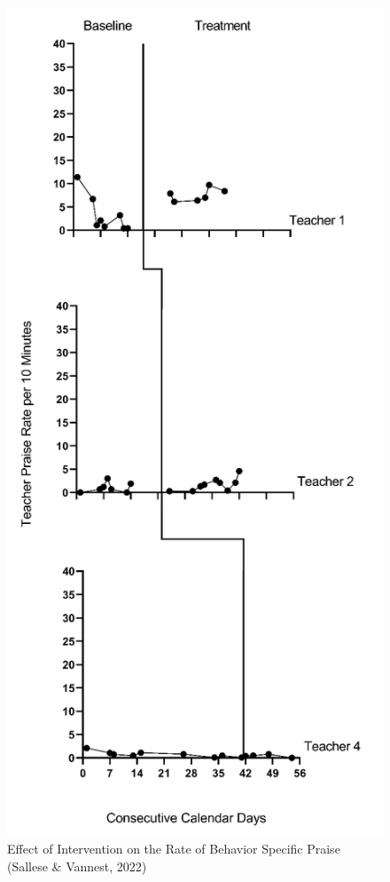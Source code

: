 \documentclass[
]{book}
\begin{document}
\begin{figure}
\includegraphics[width=0.6\linewidth]{images/CollierMeek2017} \caption{Effect of Intervention on the Rate of Behavior Specific Praise (Sallese \& Vannest, 2022)}\label{fig:SalleseVannest-raw-2022}
\end{figure}
\end{document}
